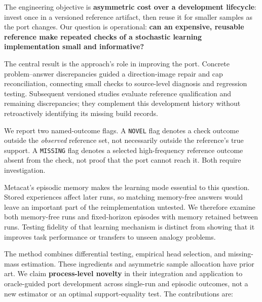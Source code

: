 \documentclass[10pt,letterpaper]{article}
\begin{document}
The engineering objective is \textbf{asymmetric cost over a development lifecycle}: invest
once in a versioned reference artifact, then reuse it for smaller samples as the port
changes. Our question is operational: \textbf{can an expensive, reusable reference make
repeated checks of a stochastic learning implementation small and informative?}

The central result is the approach's role in improving the port. Concrete problem--answer
discrepancies guided a direction-image repair and cap reconciliation, connecting small
checks to source-level diagnosis and regression testing. Subsequent versioned studies
evaluate reference qualification and remaining discrepancies; they complement this
development history without retroactively identifying its missing build records.

We report two named-outcome flags. A \texttt{NOVEL} flag denotes a check outcome outside
the \emph{observed} reference set, not necessarily outside the reference's true support. A
\texttt{MISSING} flag denotes a selected high-frequency reference outcome absent from the
check, not proof that the port cannot reach it. Both require investigation.

Metacat's episodic memory makes the learning mode essential to this question. Stored
experiences affect later runs, so matching memory-free answers would leave an important
part of the reimplementation untested. We therefore examine both memory-free runs and
fixed-horizon episodes with memory retained between runs. Testing fidelity of that
learning mechanism is distinct from showing that it improves task performance or transfers
to unseen analogy problems.

The method combines differential testing, empirical head selection, and missing-mass
estimation. These ingredients and asymmetric sample allocation have prior art. We claim
\textbf{process-level novelty} in their integration and application to oracle-guided port
development across single-run and episodic outcomes, not a new estimator or an optimal
support-equality test. The contributions are:
\end{document}
